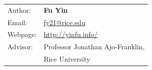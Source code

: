 \begin{titlepage}
\vspace{0.3cm}
\begin{table}[h!]
    \begin{tabular}{p{}p{}}
        Author: & \textbf{Fu Yin} \\
        Email: & \href{mailto:fy21@rice.edu}{fy21@rice.edu} \\
        Webpage: & \href{http://yinfu.info/}{http://yinfu.info/} \\
        Advisor: & Professor Jonathan Ajo-Franklin, \\
                & Rice University
    \end{tabular}
\end{table}


\end{titlepage}
